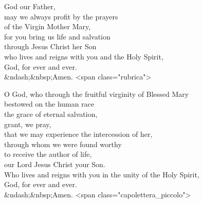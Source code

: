 \prayer

\begin{prayerverse}

God our Father,\\
may we always profit by the prayers\\
of the Virgin Mother Mary,\\
for you bring us life and salvation\\
through Jesus Christ her Son\\
who lives and reigns with you and the Holy Spirit,\\
God, for ever and ever.\\
&ndash;&nbsp;Amen.
<span class="rubrica">
\end{prayerverse}


\begin{prayerverse}

O God, who through the fruitful virginity of Blessed Mary\\
bestowed on the human race\\
the grace of eternal salvation,\\
grant, we pray,\\
that we may experience the intercession of her,\\
through whom we were found worthy\\
to receive the author of life,\\
our Lord Jesus Christ your Son.\\
Who lives and reigns with you in the unity of the Holy Spirit,\\
God, for ever and ever.\\
&ndash;&nbsp;Amen.
<span class="capolettera_piccolo">
\end{prayerverse}